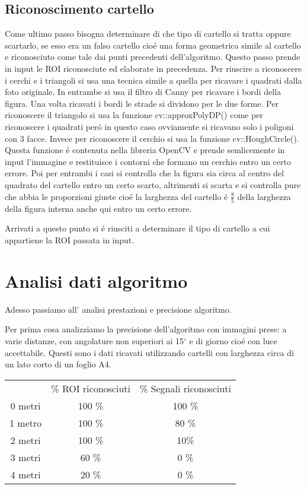 \subsection{Riconoscimento cartello}

	Come ultimo passo bisogna determinare di che tipo di cartello si tratta oppure scartarlo, se esso era un falso cartello cio\'e una forma geometrica simile al cartello e riconosciuto come tale dai punti precedenti dell'algoritmo. Questo passo prende in input le ROI riconosciute ed elaborate in precedenza. Per riuscire a riconoscere i cerchi e i triangoli si usa una tecnica simile a quella per ricavare i quadrati dalla foto originale. In entrambe si usa il filtro di Canny per ricavare i bordi della figura. Una volta ricavati i bordi le strade si dividono per le due forme. Per riconoscere il triangolo si usa la funzione cv::approxPolyDP() come per riconoscere i quadrati per\'o in questo caso ovviamente si ricavano solo i poligoni con 3 facce. Invece per riconoscere il cerchio si usa la funzione cv::HoughCircle(). Questa funzione \'e contenuta nella libreria OpenCV e prende semlicemente in input l'immagine e restituisce i contorni che formano un cerchio entro un certo errore. Poi per entrambi i casi si controlla che la figura sia circa al centro del quadrato del cartello entro un certo scarto, altrimenti si scarta e si controlla pure che abbia le proporzioni giuste cio\'e la larghezza del cartello \'e $\frac{8}{5}$ della larghezza della figura interna anche qui entro un certo errore.

	Arrivati a questo punto si \'e riusciti a determinare il tipo di cartello a cui appartiene la ROI passata in input. 

\section{Analisi dati algoritmo}

	Adesso passiamo all' analisi prestazioni e precisione algoritmo.

	Per prima cosa analizziamo la precisione dell'algoritmo con immagini prese: a varie distanze, con angolature non superiori ai 15$^{\circ}$ e di giorno cio\'e con luce accettabile.
	Questi sono i dati ricavati utilizzando cartelli con larghezza circa di un lato corto di un foglio A4.

	\begin{table}[h]
		\centering
		\begin{tabular}{ccc}
		        & \% ROI riconosciuti & \% Segnali riconosciuti \\
			0 metri & 100 \%                & 100 \%               \\
			1 metro & 100 \%                & 80 \%                \\
			2 metri & 100 \%                 & 10\%               \\
			3 metri & 60 \%                  & 0 \%                 \\
			4 metri & 20 \%                  & 0 \%                
		\end{tabular}
	\end{table}

